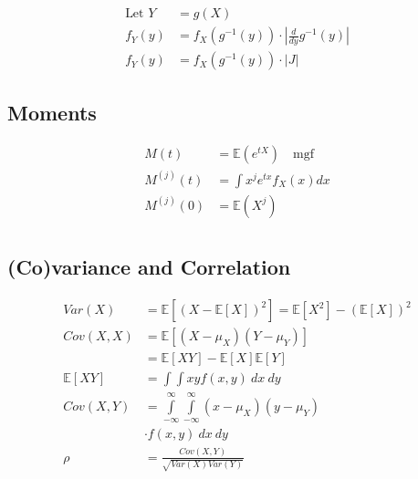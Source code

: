 \begin{align*}
    \text{Let } Y&=g(X) \\
	f_Y(y) &= f_X(g^{-1}(y)) \cdot | \frac{d}{dy}g^{-1}(y)|  \\
	f_Y(y) &= f_X(g^{-1}(y)) \cdot | J| 
\end{align*}

\subsection{Moments}

\begin{align*}
    M(t) &= \mathbb{E}(e^{tX}) \quad\text{mgf} \\
    M^{(j)}(t) &= \int x^j e^{tx} f_X(x) dx \\
    M^{(j)}(0) &= \mathbb{E}(X^j) \\
\end{align*}

\subsection{(Co)variance and Correlation}

\begin{center}
\end{center}

\begin{align*}
    Var(X) &= \mathbb{E}[(X-\mathbb{E}[X])^2] = \mathbb{E}[X^2] - (\mathbb{E}[X])^2 \\
	Cov(X,X) &= \mathbb{E}[(X-\mu_X)(Y-\mu_Y)] \\
	&= \mathbb{E}[XY] - \mathbb{E}[X]\mathbb{E}[Y] \\
	\mathbb{E}[XY] &= \int \int xyf(x,y) \: dx \: dy \\
	Cov(X,Y) &= \int\limits_{-\infty}^{\infty}\int\limits_{-\infty}^{\infty}(x-\mu_X) (y-\mu_Y) \\
	&\cdot f(x,y) \: dx \: dy \\
	\rho &= \frac{Cov(X,Y)}{\sqrt{Var(X)Var(Y)}}
\end{align*}